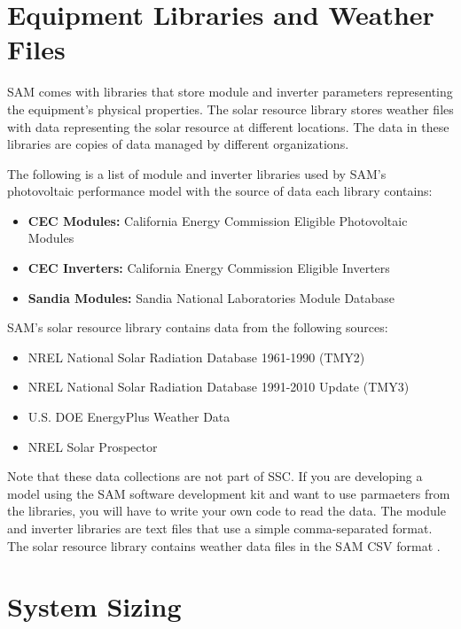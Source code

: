 \documentclass[12pt,letterpaper]{article}
\begin{document}
\section{Equipment Libraries and Weather Files} \label{sec-libraries}

SAM comes with libraries that store module and inverter parameters representing the equipment's physical properties. The solar resource library stores weather files with data representing the solar resource at different locations. The data in these libraries are copies of data managed by different organizations.

The following is a list of module and inverter libraries used by SAM's photovoltaic performance model with the source of data each library contains:
\begin{itemize}
\item \textbf{CEC Modules:} California Energy Commission Eligible Photovoltaic Modules \citep{gsc2014b}
\item \textbf{CEC Inverters:} California Energy Commission Eligible Inverters \citep{gsc2014c}
\item \textbf{Sandia Modules:} Sandia National Laboratories Module Database \citep{sandia-testeval}
\end{itemize}

SAM's solar resource library contains data from the following sources:
\begin{itemize}
\item NREL National Solar Radiation Database 1961-1990 (TMY2) \citep{nsrdb}
\item NREL National Solar Radiation Database 1991-2010 Update (TMY3) \citep{nsrdb}
\item U.S. DOE EnergyPlus Weather Data \citep{epw}
\item NREL Solar Prospector \citep{solarprospector}
\end{itemize}

Note that these data collections are not part of SSC. If you are developing a model using the SAM software development kit and want to use parmaeters from the libraries, you will have to write your own code to read the data. The module and inverter libraries are text files that use a simple comma-separated format. The solar resource library contains weather data files in the SAM CSV format \citep{help-weatherfileformats}.

\section{System Sizing} \label{sec-sizing}
\end{document}
